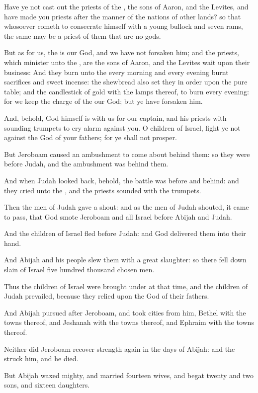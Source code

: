 \verse Have ye not cast out the priests of the \LORD, the sons of Aaron, and the Levites, and have made you priests after the manner of the nations of other lands? so that whosoever cometh to consecrate himself with a young bullock and seven rams, the same may be a priest of them that are no gods.

\verse But as for us, the \LORD is our God, and we have not forsaken him; and the priests, which minister unto the \LORD, are the sons of Aaron, and the Levites wait upon their business: \verse And they burn unto the \LORD every morning and every evening burnt sacrifices and sweet incense: the shewbread also set they in order upon the pure table; and the candlestick of gold with the lamps thereof, to burn every evening: for we keep the charge of the \LORD our God; but ye have forsaken him.

\verse And, behold, God himself is with us for our captain, and his priests with sounding trumpets to cry alarm against you. O children of Israel, fight ye not against the \LORD God of your fathers; for ye shall not prosper.

\verse But Jeroboam caused an ambushment to come about behind them: so they were before Judah, and the ambushment was behind them.

\verse And when Judah looked back, behold, the battle was before and behind: and they cried unto the \LORD, and the priests sounded with the trumpets.

\verse Then the men of Judah gave a shout: and as the men of Judah shouted, it came to pass, that God smote Jeroboam and all Israel before Abijah and Judah.

\verse And the children of Israel fled before Judah: and God delivered them into their hand.

\verse And Abijah and his people slew them with a great slaughter: so there fell down slain of Israel five hundred thousand chosen men.

\verse Thus the children of Israel were brought under at that time, and the children of Judah prevailed, because they relied upon the \LORD God of their fathers.

\verse And Abijah pursued after Jeroboam, and took cities from him, Bethel with the towns thereof, and Jeshanah with the towns thereof, and Ephraim with the towns thereof.

\verse Neither did Jeroboam recover strength again in the days of Abijah: and the \LORD struck him, and he died.

\verse But Abijah waxed mighty, and married fourteen wives, and begat twenty and two sons, and sixteen daughters.

